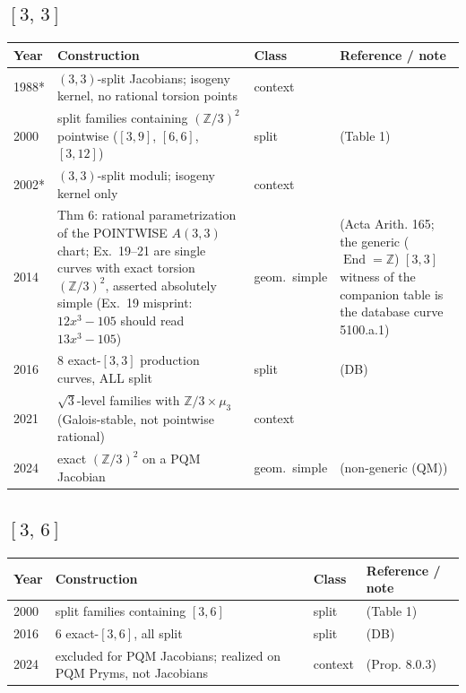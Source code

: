 \documentclass[10pt]{amsart}
\begin{document}
\subsection*{$[3,\,3]$}
\begin{longtable}{p{0.9cm} p{7.6cm} p{2.3cm} p{4.2cm}}
\hline Year & Construction & Class & Reference / note \\ \hline
1988* & $(3,3)$-split Jacobians; isogeny kernel, no rational torsion points & context & \cite{Kuhn1988}\\
2000 & split families containing $(\mathbb{Z}/3)^2$ pointwise ($[3,9]$, $[6,6]$, $[3,12]$) & split & \cite{HLP2000} (Table 1)\\
2002* & $(3,3)$-split moduli; isogeny kernel only & context & \cite{Shaska2002}\\
2014 & Thm 6: rational parametrization of the POINTWISE $A(3,3)$ chart; Ex.\ 19--21 are single curves with exact torsion $(\mathbb{Z}/3)^2$, asserted absolutely simple (Ex.\ 19 misprint: $12x^3{-}105$ should read $13x^3{-}105$) & geom.\ simple & \cite{BFT2014} (Acta Arith. 165; the generic ($\operatorname{End}=\mathbb{Z}$) $[3,3]$ witness of the companion table is the database curve 5100.a.1)\\
2016 & 8 exact-$[3,3]$ production curves, ALL split & split & \cite{BSSVY} (DB)\\
2021 & $\sqrt{3}$-level families with $\mathbb{Z}/3\times\mu_3$ (Galois-stable, not pointwise rational) & context & \cite{BFS2021}\\
2024 & exact $(\mathbb{Z}/3)^2$ on a PQM Jacobian & geom.\ simple & \cite{LSSV2024} (non-generic (QM))\\
\hline\end{longtable}
\subsection*{$[3,\,6]$}
\begin{longtable}{p{0.9cm} p{7.6cm} p{2.3cm} p{4.2cm}}
\hline Year & Construction & Class & Reference / note \\ \hline
2000 & split families containing $[3,6]$ & split & \cite{HLP2000} (Table 1)\\
2016 & 6 exact-$[3,6]$, all split & split & \cite{BSSVY} (DB)\\
2024 & excluded for PQM Jacobians; realized on PQM Pryms, not Jacobians & context & \cite{LSSV2024} (Prop. 8.0.3)\\
\hline\end{longtable}
\end{document}

